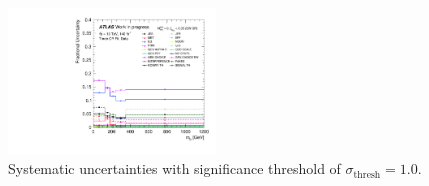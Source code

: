 \begin{figure}[H]
    \includegraphics[width=0.49\textwidth]{plots/diffx/sigthresholds/1p6/Systematic_Uncertainties_data_ly_m_3cr_QCD_Sh2211_1p6sigma.pdf}
    \caption{Systematic uncertainties with significance threshold of $\sigma_{\text{thresh}}=1.0$.\label{fig:app:thresholdonepsix}}
\end{figure}